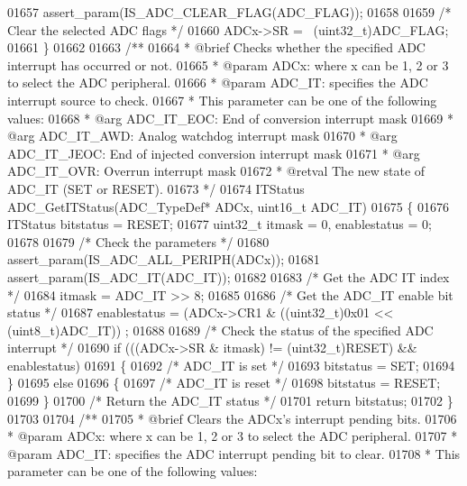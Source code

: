 \begin{DoxyCode}
01657   assert_param(IS\_ADC\_CLEAR\_FLAG(ADC\_FLAG));
01658 
01659   \textcolor{comment}{/* Clear the selected ADC flags */}
01660   ADCx->SR = ~(uint32\_t)ADC\_FLAG;
01661 \}
01662 
01663 \textcolor{comment}{/**}
01664 \textcolor{comment}{  * @brief  Checks whether the specified ADC interrupt has occurred or not.}
01665 \textcolor{comment}{  * @param  ADCx:   where x can be 1, 2 or 3 to select the ADC peripheral.}
01666 \textcolor{comment}{  * @param  ADC\_IT: specifies the ADC interrupt source to check. }
01667 \textcolor{comment}{  *          This parameter can be one of the following values:}
01668 \textcolor{comment}{  *            @arg ADC\_IT\_EOC: End of conversion interrupt mask}
01669 \textcolor{comment}{  *            @arg ADC\_IT\_AWD: Analog watchdog interrupt mask}
01670 \textcolor{comment}{  *            @arg ADC\_IT\_JEOC: End of injected conversion interrupt mask}
01671 \textcolor{comment}{  *            @arg ADC\_IT\_OVR: Overrun interrupt mask                        }
01672 \textcolor{comment}{  * @retval The new state of ADC\_IT (SET or RESET).}
01673 \textcolor{comment}{  */}
01674 ITStatus ADC_GetITStatus(ADC\_TypeDef* ADCx, uint16\_t ADC\_IT)
01675 \{
01676   ITStatus bitstatus = RESET;
01677   uint32\_t itmask = 0, enablestatus = 0;
01678 
01679   \textcolor{comment}{/* Check the parameters */}
01680   assert_param(IS\_ADC\_ALL\_PERIPH(ADCx));
01681   assert_param(IS\_ADC\_IT(ADC\_IT));
01682 
01683   \textcolor{comment}{/* Get the ADC IT index */}
01684   itmask = ADC\_IT >> 8;
01685 
01686   \textcolor{comment}{/* Get the ADC\_IT enable bit status */}
01687   enablestatus = (ADCx->CR1 & ((uint32\_t)0x01 << (uint8\_t)ADC\_IT)) ;
01688 
01689   \textcolor{comment}{/* Check the status of the specified ADC interrupt */}
01690   \textcolor{keywordflow}{if} (((ADCx->SR & itmask) != (uint32\_t)RESET) && enablestatus)
01691   \{
01692     \textcolor{comment}{/* ADC\_IT is set */}
01693     bitstatus = SET;
01694   \}
01695   \textcolor{keywordflow}{else}
01696   \{
01697     \textcolor{comment}{/* ADC\_IT is reset */}
01698     bitstatus = RESET;
01699   \}
01700   \textcolor{comment}{/* Return the ADC\_IT status */}
01701   \textcolor{keywordflow}{return}  bitstatus;
01702 \}
01703 
01704 \textcolor{comment}{/**}
01705 \textcolor{comment}{  * @brief  Clears the ADCx's interrupt pending bits.}
01706 \textcolor{comment}{  * @param  ADCx: where x can be 1, 2 or 3 to select the ADC peripheral.}
01707 \textcolor{comment}{  * @param  ADC\_IT: specifies the ADC interrupt pending bit to clear.}
01708 \textcolor{comment}{  *          This parameter can be one of the following values:}

\end{DoxyCode}
